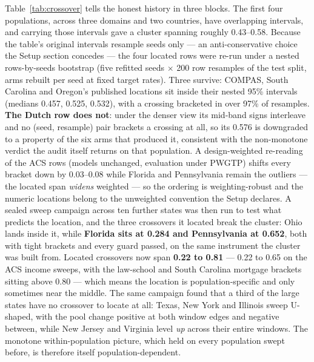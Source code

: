 \documentclass[conference]{IEEEtran}
\begin{document}
Table~\ref{tab:crossover} tells the honest history in three blocks. The first four
populations, across three domains and two countries, have overlapping intervals, and
carrying those intervals gave a cluster spanning roughly 0.43--0.58. Because the
table's original intervals resample seeds only --- an anti-conservative choice the
Setup section concedes --- the four located rows were re-run under a nested
rows-by-seeds bootstrap (five refitted seeds $\times$ 200 row resamples of the test
split, arms rebuilt per seed at fixed target rates). Three survive: COMPAS, South
Carolina and Oregon's published locations sit inside their nested 95\% intervals
(medians 0.457, 0.525, 0.532), with a crossing bracketed in over 97\% of resamples.
\textbf{The Dutch row does not}: under the denser view its mid-band signs interleave
and no (seed, resample) pair brackets a crossing at all, so its 0.576 is downgraded to
a property of the six arms that produced it, consistent with the non-monotone verdict
the audit itself returns on that population. A design-weighted re-reading of the ACS
rows (models unchanged, evaluation under PWGTP) shifts every bracket down by
0.03--0.08 while Florida and Pennsylvania remain the outliers --- the located span
\emph{widens} weighted --- so the ordering is weighting-robust and the numeric
locations belong to the unweighted convention the Setup declares. A sealed sweep campaign
across ten further states was then run to test what predicts the location, and the three
crossovers it located break the cluster: Ohio lands inside it, while \textbf{Florida sits at
0.284 and Pennsylvania at 0.652}, both with tight brackets and every guard passed, on the
same instrument the cluster was built from. Located crossovers now span \textbf{0.22 to 0.81} --- 0.22 to 0.65 on the ACS income sweeps, with the law-school and South Carolina mortgage brackets sitting above 0.80 --- which means the location is population-specific and only sometimes near the middle. The same campaign found that a third of the large states have no crossover to
locate at all: Texas, New York and Illinois sweep U-shaped, with the pool change positive
at both window edges and negative between, while New Jersey and Virginia level \emph{up}
across their entire windows. The monotone within-population picture, which held on every
population swept before, is therefore itself population-dependent.
\end{document}
